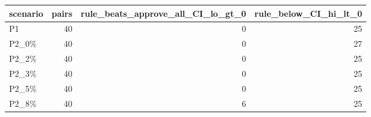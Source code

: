 \begin{tabular}{lrrr}
\toprule
scenario & pairs & rule\_beats\_approve\_all\_CI\_lo\_gt\_0 & rule\_below\_CI\_hi\_lt\_0 \\
\midrule
P1 & 40 & 0 & 25 \\
P2\_0\% & 40 & 0 & 27 \\
P2\_2\% & 40 & 0 & 25 \\
P2\_3\% & 40 & 0 & 25 \\
P2\_5\% & 40 & 0 & 25 \\
P2\_8\% & 40 & 6 & 25 \\
\bottomrule
\end{tabular}
